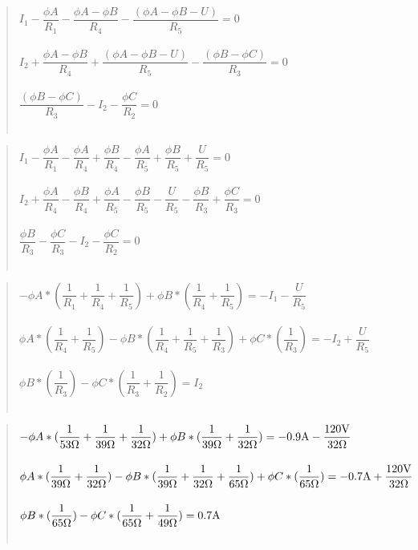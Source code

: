 \begin{quote}
    \medskip
    \medskip
    \centering
    $I_1 - \dfrac{\phi A}{R_1} - \dfrac{\phi A - \phi B}{R_4} - \dfrac{(\phi A - \phi B - U)}{R_5} = 0$ \\~\\ 
    $I_2 + \dfrac{\phi A - \phi B}{R_4} + \dfrac{(\phi A - \phi B - U)}{R_5} - \dfrac{(\phi B - \phi C)}{R_3} = 0$ \\~\\
    $ \dfrac{(\phi B - \phi C)}{R_3} - I_2 - \dfrac{\phi C}{R_2} = 0$ \\~\\
\end{quote}

\begin{quote}
    \medskip
    \medskip
    \centering
    $I_1 - \dfrac{\phi A}{R_1} -  \dfrac{\phi A}{R_4} + \dfrac{\phi B}{R_4} - \dfrac{\phi A}{R_5} + \dfrac{\phi B}{R_5} + \dfrac{U}{R_5}= 0$ \\~\\ 
    $I_2 + \dfrac{\phi A}{R_4} -  \dfrac{\phi B}{R_4} + \dfrac{\phi A}{R_5} - \dfrac{\phi B}{R_5} - \dfrac{U}{R_5} - \dfrac{\phi B}{R_3} + \dfrac{\phi C}{R_3}= 0$ \\~\\ 
    $\dfrac{\phi B}{R_3} - \dfrac{\phi C}{R_3} - I_2 - \dfrac{\phi C}{R_2} = 0$ \\~\\ 
\end{quote}

\begin{quote}
    \medskip
    \medskip
    \centering
    $-\phi A * (\dfrac{1}{R_1} +  \dfrac{ 1}{R_4} + \dfrac{1}{R_5}) + \phi B * (\dfrac{ 1}{R_4} + \dfrac{ 1}{R_5})  = -I_1 - \dfrac{U}{R_5}$ \\~\\ 
    $\phi A * (\dfrac{1}{R_4} + \dfrac{1}{R_5}) - \phi B * (\dfrac{1}{R_4} + \dfrac{1}{R_5} + \dfrac{1}{R_3}) + \phi C * (\dfrac{1}{R_3})  = -I_2 + \dfrac{U}{R_5}$ \\~\\
    $\phi B * (\dfrac{1}{R_3}) - \phi C * (\dfrac{1}{R_3} + \dfrac{1}{R_2})  = I_2 $ \\~\\
\end{quote}


\begin{quote}
    \medskip
    \medskip
    \centering
    $-\phi A * (\dfrac{1}{53\Omega} +  \dfrac{ 1}{39\Omega} + \dfrac{1}{32\Omega}) + \phi B * (\dfrac{ 1}{39\Omega} + \dfrac{ 1}{32\Omega})  = -0.9\Am - \dfrac{120\Vo}{32\Omega}$ \\~\\ 
    $\phi A * (\dfrac{1}{39\Omega} + \dfrac{1}{32\Omega}) - \phi B * (\dfrac{1}{39\Omega} + \dfrac{1}{32\Omega} + \dfrac{1}{65\Omega}) + \phi C * (\dfrac{1}{65\Omega})  = -0.7\Am + \dfrac{120\Vo}{32\Omega}$ \\~\\
    $\phi B * (\dfrac{1}{65\Omega}) - \phi C * (\dfrac{1}{65\Omega} + \dfrac{1}{49\Omega})  = 0.7\Am $ \\~\\
\end{quote}

